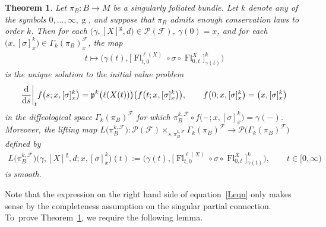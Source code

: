 \documentclass[pdftex]{sigma}
\numberwithin{equation}{section}
\newtheorem{Theorem}{Theorem}[section]
\def\g{\operatorname{g}}
\def\Fl{\operatorname{Fl}}
\def\FF{{\mathcal{F}}}
\def\PP{{\mathcal{P}}}
\def\pf{{\mathfrak{p}}}
\begin{document}
\begin{Theorem}\label{liftsmooth}
Let $\pi_{B}\colon B\rightarrow M$ be a singularly foliated bundle. Let $k$ denote any of the symbols $0,\dots,\infty,\g$, and suppose that $\pi_{B}$ admits enough conservation laws to order $k$. Then for each $\big(\gamma,[X]^{\g},d\big)\in\PP(\FF)$, $\gamma(0) = x$, and for each $\big(x,[\sigma]^{k}_{x}\big)\in\Gamma_{k}(\pi_{B})^{\FF}_{x}$, the map
\begin{gather}\label{ivpsol}
t\mapsto\big(\gamma(t),\big[\Fl^{\ell(X)}_{t,0}\circ\sigma\circ\Fl^{X}_{0,t}\big]^{k}_{\gamma(t)}\big)
\end{gather}
is the unique solution to the initial value problem
\begin{gather}\label{ivp}
\frac{\rm d}{{\rm d}s}\bigg|_{t}f\big(s;x,[\sigma]^{k}_{x}\big) = \pf^{k}\big(\ell(X(t))\big)\big(f\big(t;x,[\sigma]^{k}_{x}\big)\big),\qquad
f\big(0;x,[\sigma]^{k}_{x}\big) = \big(x,[\sigma]^{k}_{x}\big)
\end{gather}
in the diffeological space $\Gamma_{k}(\pi_{B})^{\FF}$ for which $\pi_{B}^{k,\FF}\circ f\big({-};x,[\sigma]^{k}_{x}\big) = \gamma(-)$. Moreover, the lifting map $L\big(\pi_{B}^{k,\FF}\big)\colon \PP(\FF)\times_{s,\pi_{B}^{k,\FF}}\Gamma_{k}(\pi_{B})^{\FF}\rightarrow \PP\big(\Gamma_{k}(\pi_{B})^{\FF}\big)$ defined by
\begin{gather}\label{Leqn}
L\big(\pi_{B}^{k,\FF}\big)\big(\gamma,[X]^{\g},d;x,[\sigma]^{k}_{x}\big)(t):=
\big(\gamma(t),\big[\Fl^{\ell(X)}_{t,0}\circ\sigma\circ\Fl^{X}_{0,t}\big]^{k}_{\gamma(t)}\big),\qquad t\in[0,\infty)
\end{gather}
is smooth.
\end{Theorem}

Note that the expression on the right hand side of equation~\eqref{Leqn} only makes sense by the completeness assumption on the singular partial connection. To~prove Theorem~\ref{liftsmooth}, we require the following lemma.
\end{document}
